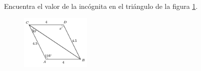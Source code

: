 \question[10]  Encuentra el valor de la incógnita en el triángulo de la figura \ref{fig:angle_triangle_02}.
\begin{figure}[H]
    \begin{center}
        \includegraphics[width=0.3\textwidth]{../images/angle_triangle_02.png}
    \end{center}
    \caption{}
    \label{fig:angle_triangle_02}
\end{figure}